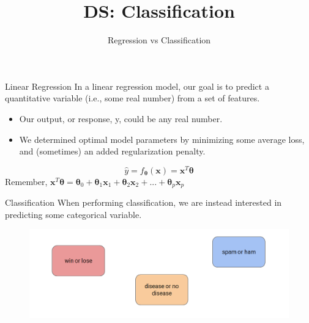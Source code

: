 \documentclass[aspectratio=169]{../latex_main/tntbeamer}  %
\title[Regression vs Classification]{DS: Classification}
\subtitle{Regression vs Classification}
\begin{document}
	
	\maketitle
	\begin{frame}{Linear Regression}
	    In a linear regression model, our goal is to predict a quantitative variable (i.e., some real number) from a set of features.
	    \begin{itemize}
	        \item Our output, or response, y, could be any real number.
	        \item We determined optimal model parameters by minimizing some average loss, and (sometimes) an added regularization penalty.
	    \end{itemize}
	    \begin{equation*}
	        \hat{y} = f_{\bm{\theta}} (\bm{x}) = \bm{x}^T\bm{\theta}
	    \end{equation*}
	    Remember, $\bm{x}^T\bm{\theta} = \bm{\theta}_0 + \bm{\theta}_1\bm{x}_1 + \bm{\theta}_2\bm{x}_2 + ... + \bm{\theta}_p\bm{x}_p$ 
	\end{frame}
	
	
	\begin{frame}{Classification}
	    When performing classification, we are instead interested in predicting some categorical variable.
	    \begin{figure}
	        \centering
	        \includegraphics[scale=.35]{Bild1}
	    \end{figure}
	\end{frame}
	
\end{document}
